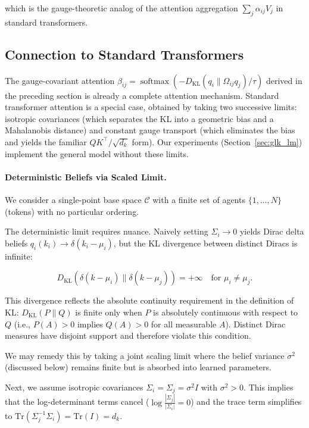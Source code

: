 \documentclass[twoside,11pt]{article}
\begin{document}
which is the gauge-theoretic analog of the attention aggregation $\sum_j \alpha_{ij} V_j$ in standard transformers.

\subsection{Connection to Standard Transformers}

The gauge-covariant attention $\beta_{ij} = \operatorname{softmax}(-D_{\mathrm{KL}}(q_i \| \Omega_{ij} q_j)/\tau)$ derived in the preceding section is already a complete attention mechanism. Standard transformer attention is a special case, obtained by taking two successive limits: isotropic covariances (which separates the KL into a geometric bias and a Mahalanobis distance) and constant gauge transport (which eliminates the bias and yields the familiar $QK^\top / \sqrt{d_k}$ form). Our experiments (Section~\ref{sec:glk_lm}) implement the general model without these limits.

\paragraph{Deterministic Beliefs via Scaled Limit.}

We consider a single-point base space $\mathcal{C}$ with a finite set of agents $\{1,\dots,N\}$ (tokens) with no particular ordering. 

The deterministic limit requires nuance. Naively setting $\Sigma_i \to 0$ yields Dirac delta beliefs $q_i(k_i) \to \delta(k_i - \mu_i)$, but the KL divergence between distinct Diracs is infinite:

\begin{equation}
D_{\mathrm{KL}}(\delta(k - \mu_i) \| \delta(k - \mu_j)) = +\infty \quad \text{for } \mu_i \neq \mu_j.
\end{equation}

This divergence reflects the absolute continuity requirement in the definition of KL: $D_{\mathrm{KL}}(P \| Q)$ is finite only when $P$ is absolutely continuous with respect to $Q$ (i.e., $P(A) > 0$ implies $Q(A) > 0$ for all measurable $A$). Distinct Dirac measures have disjoint support and therefore violate this condition.

We may remedy this by taking a joint scaling limit where the belief variance $\sigma^2$ (discussed below) remains finite but is absorbed into learned parameters.

Next, we assume isotropic covariances $\Sigma_i = \Sigma_j = \sigma^2 I$ with $\sigma^2 > 0$. This implies that the log-determinant terms cancel ($\log\frac{|\Sigma_j|}{|\Sigma_i|} = 0$) and the trace term simplifies to $\mathrm{Tr}(\Sigma_j^{-1}\Sigma_i) = \mathrm{Tr}(I) = d_k$.
\end{document}
